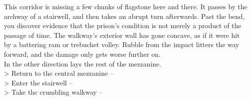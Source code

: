 This corridor is missing a few chunks of flagstone here and there. It passes by the archway of a stairwell, and then takes an abrupt turn afterwards. Past the bend, you discover evidence that the prison’s condition is not merely a product of the passage of time. The walkway's exterior wall has gone concave, as if it were hit by a battering ram or trebuchet volley. Rubble from the impact litters the way forward, and the damage only gets worse further on.\\

In the other direction lays the rest of the mezzanine.\\

> Return to the central mezzanine -- \\
> Enter the stairwell -- \\
> Take the crumbling walkway -- \\